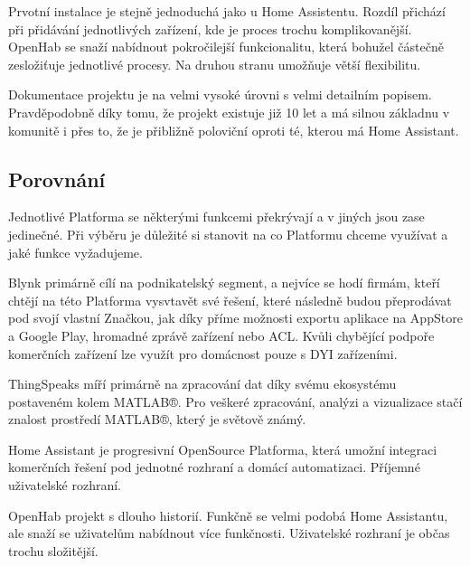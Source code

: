 \documentclass[thesis=B,czech]{FITthesis}[2019/12/23]
\begin{document}
Prvotní instalace je stejně jednoduchá jako u Home Assistentu. Rozdíl přichází při přidávání jednotlivých zařízení, kde je proces trochu komplikovanější. OpenHab se snaží nabídnout pokročilejší funkcionalitu, která bohužel částečně zesložiťuje jednotlivé procesy. Na druhou stranu umožňuje větší flexibilitu.
 
Dokumentace projektu je na velmi vysoké úrovni s velmi detailním popisem. Pravděpodobně díky tomu, že projekt existuje již 10 let a má silnou základnu v komunitě i přes to, že je přibližně poloviční oproti té, kterou má Home Assistant. 

\subsection{Porovnání}
Jednotlivé Platforma se některými funkcemi překrývají a v jiných jsou zase jedinečné. Při výběru je důležité si stanovit na co Platformu chceme využívat a jaké funkce vyžadujeme. 

Blynk primárně cílí na podnikatelský segment, a nejvíce se hodí firmám, kteří chtějí na této Platforma vysvtavět své řešení, které následně budou přeprodávat pod svojí vlastní Značkou, jak díky příme možnosti exportu aplikace na AppStore a Google Play, hromadné zprávě zařízení nebo ACL. Kvůli chybějící podpoře komerčních zařízení lze využít pro domácnost pouze s DYI zařízeními.

ThingSpeaks míří primárně na zpracování dat díky svému ekosystému postaveném kolem MATLAB®. Pro veškeré zpracování, analýzi a vizualizace stačí znalost prostředí MATLAB®, který je světově známý.

Home Assistant je progresivní OpenSource Platforma, která umožní integraci komerčních řešení pod jednotné rozhraní a domácí automatizaci. Příjemné uživatelské rozhraní.

OpenHab projekt s dlouho historií. Funkčně se velmi podobá Home Assistantu, ale snaží se uživatelům nabídnout více funkčnosti. Uživatelské rozhraní je občas trochu složitější.
\end{document}
